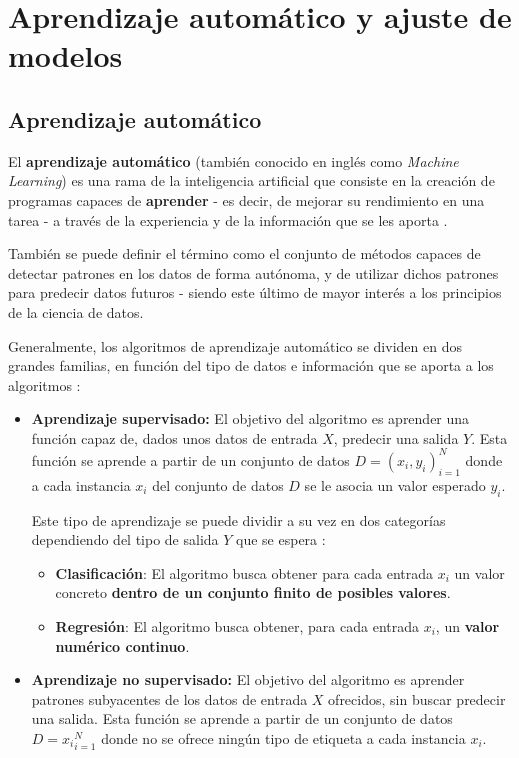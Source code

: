 \section{Aprendizaje automático y ajuste de modelos}

\subsection{Aprendizaje automático}

El \textbf{aprendizaje automático} (también conocido en inglés como \textit{Machine Learning}) es una rama de la inteligencia artificial que consiste en la creación de programas capaces de \textbf{aprender} - es decir, de mejorar su rendimiento en una tarea - a través de la experiencia y de la información que se les aporta \cite{mitchell1997machine}. 

También se puede definir el término como el conjunto de métodos capaces de detectar patrones en los datos de forma autónoma, y de utilizar dichos patrones para predecir datos futuros \cite{mlprobabilistic} - siendo este último de mayor interés a los principios de la ciencia de datos.

Generalmente, los algoritmos de aprendizaje automático se dividen en dos grandes familias, en función del tipo de datos e información que se aporta a los algoritmos \cite{aima} \cite{mlprobabilistic}:

\begin{itemize}
	\item \textbf{Aprendizaje supervisado:} El objetivo del algoritmo es aprender una función capaz de, dados unos datos de entrada $X$, predecir una salida $Y$. Esta función se aprende a partir de un conjunto de datos $D={(x_i, y_i)}^{N}_{i=1}$ donde a cada instancia $x_i$ del conjunto de datos $D$ se le asocia un valor esperado $y_i$.
	
	Este tipo de aprendizaje se puede dividir a su vez en dos categorías dependiendo del tipo de salida $Y$ que se espera \cite{aima}:
	\begin{itemize}
		\item \textbf{Clasificación}: El algoritmo busca obtener para cada entrada $x_i$ un valor concreto \textbf{dentro de un conjunto finito de posibles valores}.
		\item \textbf{Regresión}: El algoritmo busca obtener, para cada entrada $x_i$, un \textbf{valor numérico continuo}.
	\end{itemize}
	\item \textbf{Aprendizaje no supervisado:} El objetivo del algoritmo es aprender patrones subyacentes de los datos de entrada $X$ ofrecidos, sin buscar predecir una salida. Esta función se aprende a partir de un conjunto de datos $D={x_i}^{N}_{i=1}$ donde no se ofrece ningún tipo de etiqueta a cada instancia $x_i$.
\end{itemize}

